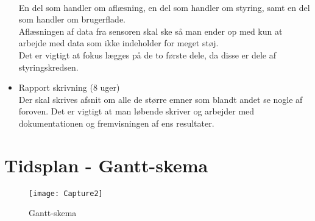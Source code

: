 \begin{itemize}
\\	En del som handler om aflæsning, en del som handler om styring, samt en del som handler om brugerflade.
\\	Aflæsningen af data fra sensoren skal ske så man ender op med kun at arbejde med data som ikke indeholder for meget støj.
\\	Det er vigtigt at fokus lægges på de to første dele, da disse er dele af styringskredsen.
\item	Rapport skrivning (8 uger)
\\	Der skal skrives afsnit om alle de større emner som blandt andet se nogle af foroven. Det er vigtigt at man løbende skriver og arbejder med dokumentationen og fremvisningen af ens resultater.



\end{itemize}

\clearpage
\section{Tidsplan - Gantt-skema}
\begin{figure}[!h]
\centering
\texttt{[image: Capture2]}
\caption{Gantt-skema}
\label{FIG:DTULOGO}
\end{figure}